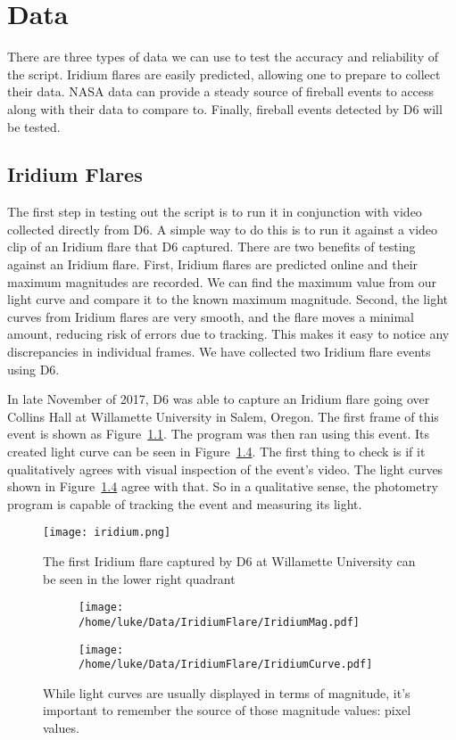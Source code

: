 \chapter{Data}

There are three types of data we can use to test the accuracy and reliability of the script. Iridium flares are easily predicted, allowing one to prepare to collect their data. NASA data can provide a steady source of fireball events to access along with their data to compare to. Finally, fireball events detected by D6 will be tested.

\section{Iridium Flares}

The first step in testing out the script is to run it in conjunction with video collected directly from D6. A simple way to do this is to run it against a video clip of an Iridium flare that D6 captured. There are two benefits of testing against an Iridium flare. First, Iridium flares are predicted online and their maximum magnitudes are recorded. We can find the maximum value from our light curve and compare it to the known maximum magnitude. Second, the light curves from Iridium flares are very smooth, and the flare moves a minimal amount, reducing risk of errors due to tracking. This makes it easy to notice any discrepancies in individual frames. We have collected two Iridium flare events using D6. 

In late November of 2017, D6 was able to capture an Iridium flare going over Collins Hall at Willamette University in Salem, Oregon. The first frame of this event is shown as Figure~\ref{fig:Iridium}. The program was then ran using this event. Its created light curve can be seen in Figure~\ref{fig:IridiumCurves}. The first thing to check is if it qualitatively agrees with visual inspection of the event's video. The light curves shown in Figure~\ref{fig:IridiumCurves} agree with that. So in a qualitative sense, the photometry program is capable of tracking the event and measuring its light. 

\begin{figure}[h!]
	\centering
	\texttt{[image: iridium.png]}
	\caption{The first Iridium flare captured by D6 at Willamette University can be seen in the lower right quadrant}
	\label{fig:Iridium}
\end{figure}

\begin{figure}
\centering
\begin{subfigure}{.5\textwidth}
	\centering
	\texttt{[image: /home/luke/Data/IridiumFlare/IridiumMag.pdf]}
	\label{fig:Iridiummag}
\end{subfigure}%
\begin{subfigure}{.5\textwidth}
	\centering
	\texttt{[image: /home/luke/Data/IridiumFlare/IridiumCurve.pdf]}
	\label{fig:Iridiumcurve}
	\end{subfigure}
\caption{While light curves are usually displayed in terms of magnitude, it's important to remember the source of those magnitude values: pixel values.}
\label{fig:IridiumCurves}
\end{figure}

